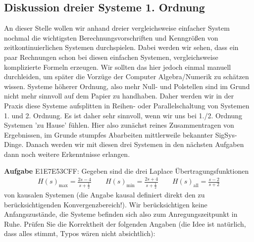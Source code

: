 \subsection{Diskussion dreier Systeme 1. Ordnung}
\label{sec:E1E7E53CFF}
\begin{Ziel}
An dieser Stelle wollen wir anhand dreier vergleichsweise einfacher System
nochmal die wichtigsten Berechnungsvorschriften und Kenngrößen von
zeitkontinuierlichen Systemen durchspielen.
Dabei werden wir sehen, dass ein paar Rechnungen schon bei diesen einfachen
Systemen, vergleichsweise komplizierte Formeln erzeugen.
Wir sollten das hier jedoch einmal manuell durchleiden, um später die Vorzüge der
Computer Algebra/Numerik zu schätzen wissen. Systeme höherer Ordnung, also mehr Null-
und Polstellen sind im Grund nicht mehr sinnvoll auf dem Papier zu handhaben.
Daher werden wir in der Praxis diese Systeme aufsplitten in Reihen- oder
Parallelschaltung von Systemen 1. und 2. Ordnung. Es ist daher sehr sinnvoll,
wenn wir uns bei 1./2. Ordnung Systemen 'zu Hause' fühlen.
Hier also zunächst reines Zusammentragen von Ergebnissen, im Grunde stumpfes
Abarbeiten mittlerweile bekannter SigSys-Dinge. Danach werden wir mit diesen
drei Systemen in den nächsten Aufgaben dann noch weitere Erkenntnisse
erlangen.
\end{Ziel}
\textbf{Aufgabe} {\tiny E1E7E53CFF}: Gegeben sind die drei Laplace
Übertragungsfunktionen
\begin{align}
H(s)_\mathrm{max} = \frac{2 s-4}{s+\frac{1}{2}}\qquad
H(s)_\mathrm{min} = \frac{2 s+4}{s+\frac{1}{2}}\qquad
H(s)_\mathrm{all} = \frac{s-2}{s+2}
\end{align}
von kausalen Systemen (die Angabe kausal definiert direkt den zu berücksichtigenden
Konvergenzbereich!).
Wir berücksichtigen keine Anfangszustände, die Systeme
befinden sich also zum Anregungszeitpunkt in Ruhe.
%
Prüfen Sie die Korrektheit der folgenden Angaben (die Idee ist natürlich,
dass alles stimmt, Typos wären nicht absichtlich):
